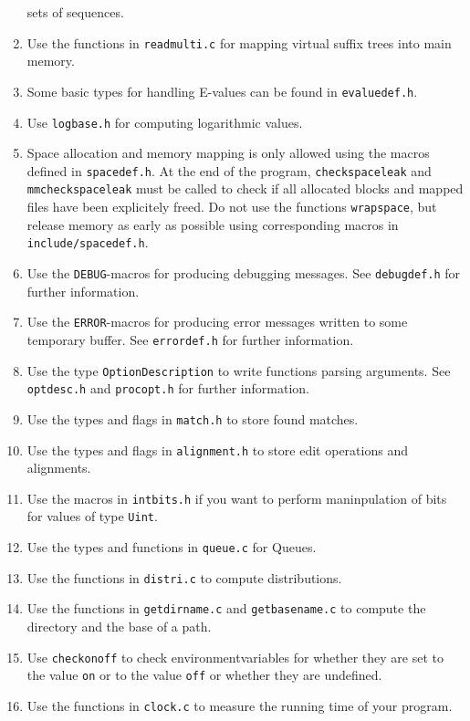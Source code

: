 \documentclass[12pt]{article}
\begin{document}
\begin{enumerate}
sets of sequences.
\item
Use the functions in \texttt{readmulti.c} for mapping virtual suffix
trees into main memory.
\item
Some basic types for handling E-values can be found in
\texttt{evaluedef.h}.
\item
Use \texttt{logbase.h} for computing logarithmic values.
\item
Space allocation and memory mapping is only allowed using the macros
defined in \texttt{spacedef.h}. At the end of the program,
\texttt{checkspaceleak} and \texttt{mmcheckspaceleak} must be called to check
if all allocated blocks and mapped files have been explicitely freed.
Do not use the functions \texttt{wrapspace}, but release memory as
early as possible using corresponding macros in \texttt{include/spacedef.h}.
\item
Use the \texttt{DEBUG}-macros for producing debugging messages. See
\texttt{debugdef.h} for further information.
\item
Use the \texttt{ERROR}-macros for producing error messages written
to some temporary buffer. See \texttt{errordef.h} for further information.
\item
Use the type \texttt{OptionDescription} to write functions parsing arguments.
See \texttt{optdesc.h} and \texttt{procopt.h} for further information.
\item
Use the types and flags in \texttt{match.h} to store found matches.
\item
Use the types and flags in \texttt{alignment.h} to store edit operations
and alignments.
\item
Use the macros in \texttt{intbits.h} if you want to perform maninpulation
of bits for values of type \texttt{Uint}.
\item
Use the types and functions in \texttt{queue.c} for Queues.
\item
Use the functions in \texttt{distri.c} to compute distributions.
\item
Use the functions in \texttt{getdirname.c} and \texttt{getbasename.c}
to compute the directory and the base of a path.
\item
Use \texttt{checkonoff} to check environmentvariables for whether they
are set to the value \texttt{on} or to the value \texttt{off} or whether
they are undefined.
\item
Use the functions in \texttt{clock.c} to measure the running
time of your program.
\end{enumerate}
\end{document}
